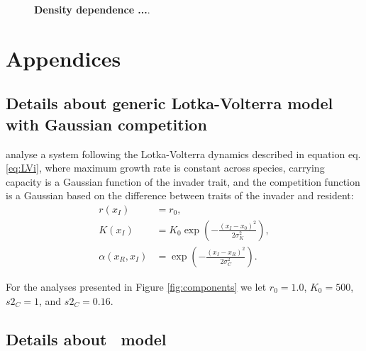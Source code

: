 \documentclass[a4paper,11pt]{article}
\begin{document}
\begin{figure}[h]
  \centering
  \caption{\textbf{Density dependence
  ...}.
  \label{fig:dd}}
\end{figure}

\clearpage




\section{Appendices}

\subsection{Details about generic Lotka-Volterra model with
Gaussian competition}\label{sec:DD99}

\citet{Dieckmann-1999} analyse a system following the Lotka-Volterra dynamics
described in equation eq. \ref{eq:LVi}, where maximum growth rate is constant
across species, carrying capacity is a Gaussian
function of the invader trait, and the competition function is a Gaussian
based on the difference between traits of the invader and resident:
\begin{subequations}
\begin{align}
\label{eq:DD}
r(x_I) &= r_0, \\
K(x_I) &= K_0 \exp\left(-\frac{\left(x_I-x_0\right)^2}{2\sigma^2_K}\right),\\
\alpha(x_R, x_I) &= \exp\left(-\frac{\left(x_I-x_R\right)^2}{2\sigma^2_C}\right).
\end{align}
\end{subequations}

For the analyses presented in Figure \ref{fig:components} we let $r_0=1.0$, $K_0=500$,
 $s2_C=1$, and $s2_C=0.16$.

\subsection{Details about \Rstar\ model}\label{sec:Rstar}
\end{document}
